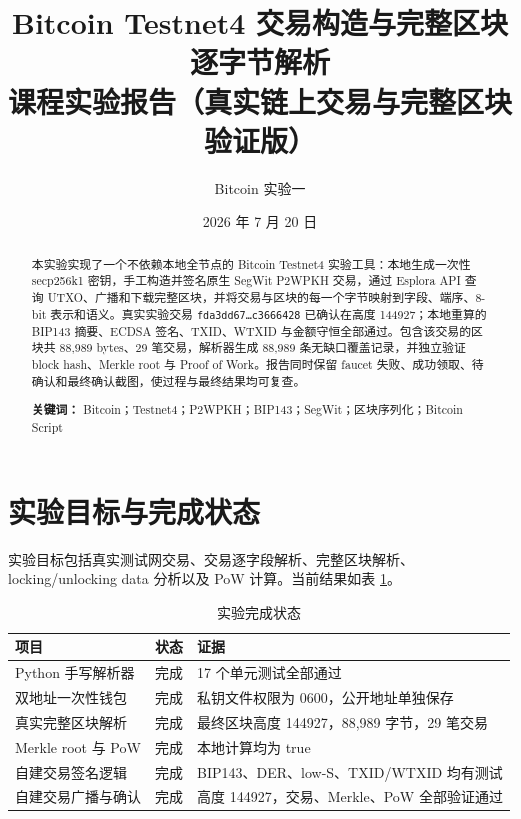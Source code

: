 \documentclass[11pt,a4paper,fontset=none]{ctexart}
\title{\bfseries Bitcoin Testnet4 交易构造与完整区块逐字节解析\\[0.5em]
\large 课程实验报告（真实链上交易与完整区块验证版）}
\author{Bitcoin 实验一}
\date{2026 年 7 月 20 日}
\begin{document}
\maketitle

\begin{abstract}
本实验实现了一个不依赖本地全节点的 Bitcoin Testnet4 实验工具：本地生成一次性 secp256k1 密钥，手工构造并签名原生 SegWit P2WPKH 交易，通过 Esplora API 查询 UTXO、广播和下载完整区块，并将交易与区块的每一个字节映射到字段、端序、8-bit 表示和语义。真实实验交易 \texttt{fda3dd67\ldots c3666428} 已确认在高度 144927；本地重算的 BIP143 摘要、ECDSA 签名、TXID、WTXID 与金额守恒全部通过。包含该交易的区块共 88,989 bytes、29 笔交易，解析器生成 88,989 条无缺口覆盖记录，并独立验证 block hash、Merkle root 与 Proof of Work。报告同时保留 faucet 失败、成功领取、待确认和最终确认截图，使过程与最终结果均可复查。

\textbf{关键词：} Bitcoin；Testnet4；P2WPKH；BIP143；SegWit；区块序列化；Bitcoin Script
\end{abstract}

\clearpage
\tableofcontents
\newpage

\section{实验目标与完成状态}

实验目标包括真实测试网交易、交易逐字段解析、完整区块解析、locking/unlocking data 分析以及 PoW 计算。当前结果如表 \ref{tab:status}。

\begin{table}[htbp]
\centering
\caption{实验完成状态}
\label{tab:status}
\begin{tabular}{p{}p{}p{}}
\toprule
项目 & 状态 & 证据 \\
\midrule
Python 手写解析器 & 完成 & 17 个单元测试全部通过 \\
双地址一次性钱包 & 完成 & 私钥文件权限为 0600，公开地址单独保存 \\
真实完整区块解析 & 完成 & 最终区块高度 144927，88,989 字节，29 笔交易 \\
Merkle root 与 PoW & 完成 & 本地计算均为 true \\
自建交易签名逻辑 & 完成 & BIP143、DER、low-S、TXID/WTXID 均有测试 \\
自建交易广播与确认 & 完成 & 高度 144927，交易、Merkle、PoW 全部验证通过 \\
\bottomrule
\end{tabular}
\end{table}
\end{document}
